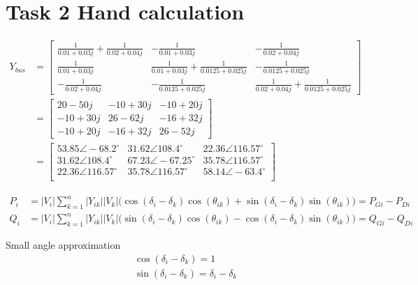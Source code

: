 \documentclass{article}
\begin{document}
\newpage


\section*{Task 2 Hand calculation}

\begin{align*}
Y_{bus} &= 
\begin{bmatrix}
\frac{1}{0.01+0.03j} + \frac{1}{0.02+0.04j} &-\frac{1}{0.01+0.03j} &-\frac{1}{0.02+0.04j}\\
\frac{1}{0.01+0.03j} &\frac{1}{0.01+0.03j} + \frac{1}{0.0125+0.025j} &-\frac{1}{0.0125+0.025j}\\
-\frac{1}{0.02+0.04j} &-\frac{1}{0.0125+0.025j} &\frac{1}{0.02+0.04j} + \frac{1}{0.0125+0.025j}
\end{bmatrix}\\
&=
\begin{bmatrix}
20-50j &-10+30j &-10+20j\\
-10+30j &26-62j &-16+32j\\
-10+20j &-16+32j &26-52j
\end{bmatrix}\\
&=
\begin{bmatrix}
53.85 \angle -68.2^{\circ} &31.62 \angle 108.4^{\circ} &22.36 \angle 116.57^{\circ}\\
31.62 \angle 108.4^{\circ} &67.23 \angle -67.25^{\circ} &35.78 \angle 116.57^{\circ}\\
22.36 \angle 116.57^{\circ} &35.78 \angle 116.57^{\circ} &58.14 \angle -63.4^{\circ}\\
\end{bmatrix}
\end{align*}

\begin{align*}
P_i &= |V_i| \sum^n_{k=1} |Y_{ik}| |V_k| \Big( \cos(\delta_i - \delta_k) \cos(\theta_{ik}) + \sin(\delta_i - \delta_k) \sin(\theta_{ik}) \Big) = P_{Gi} - P_{Di}\\
Q_i &= |V_i| \sum^n_{k=1} |Y_{ik}| |V_k| \Big( \sin(\delta_i - \delta_k) \cos(\theta_{ik}) - \cos(\delta_i - \delta_k) \sin(\theta_{ik}) \Big) = Q_{Gi} - Q_{Di}
\end{align*}

Small angle approximation
\begin{align*}
&\cos(\delta_i - \delta_k) = 1\\
&\sin(\delta_i - \delta_k) = \delta_i - \delta_k
\end{align*}
\end{document}
